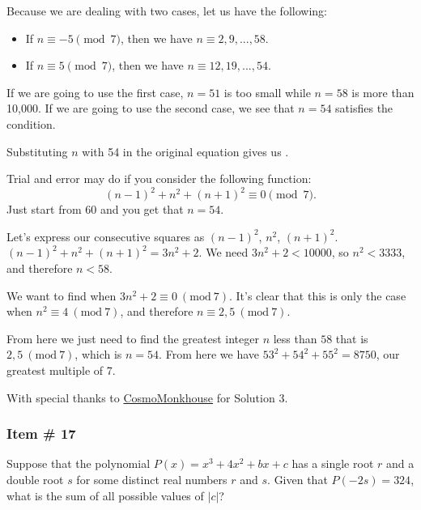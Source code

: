 \documentclass[11pt,paper=letter]{scrartcl}
\begin{document}
Because we are dealing with two cases, let us have the following:

\begin{itemize}
    \item If $n \equiv -5 \pmod{7}$, then we have $n \equiv 2, 9, ... , 58$.
    
    \item If $n \equiv 5 \pmod{7}$, then we have $n \equiv 12,19, ... , 54$.
\end{itemize}

If we are going to use the first case, $n=51$ is too small while $n = 58$ is more than 10,000. If we are going to use the second case, we see that $n = 54$ satisfies the condition.

Substituting $n$ with 54 in the original equation gives us .


Trial and error may do if you consider the following function: $$(n-1)^2 + n^2 + (n+1)^2 \equiv 0 \pmod{7}.$$ Just start from $60$ and you get that $n = 54$.


Let's express our consecutive squares as $(n-1)^2$, $n^2$, $(n+1)^2$. $(n-1)^2 + n^2 + (n+1)^2 = 3n^2 + 2$. We need $3n^2 + 2 < 10000$, so $n^2 < 3333$, and therefore $n < 58$.

We want to find when $3n^2 + 2 \equiv 0 {\ (\mathrm{mod}\ 7)}$. It's clear that this is only the case when $n^2 \equiv 4 {\ (\mathrm{mod}\ 7)}$, and therefore $n \equiv 2, 5 {\ (\mathrm{mod}\ 7)}$.

From here we just need to find the greatest integer $n$ less than $58$ that is $2, 5 {\ (\mathrm{mod}\ 7)}$, which is $n = 54$. From here we have $53^2 + 54^2 + 55^2 = \boxed{8750}$, our greatest multiple of 7.

\begin{mdframed}
\begin{rem}
With special thanks to \href{https://artofproblemsolving.com/community/user/536265}{CosmoMonkhouse} for Solution 3.
\end{rem}
\end{mdframed}
\subsubsection{Item \# 17}

\begin{probboxed}
Suppose that the polynomial $P(x) = x^3 + 4x^2 + bx +c$ has a single root $r$ and a double root $s$ for some distinct real numbers $r$ and $s$. Given that $P(-2s) = 324$, what is the sum of all possible values of $|c|$?
\end{probboxed}
\end{document}

